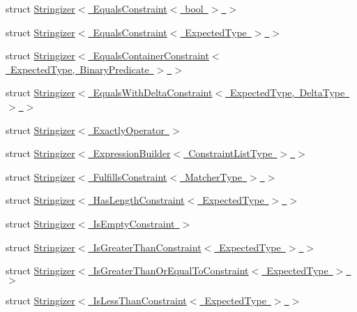 \begin{DoxyCompactItemize}
\item 
struct \mbox{\hyperlink{structsnowhouse_1_1Stringizer_3_01EqualsConstraint_3_01bool_01_4_01_4}{Stringizer$<$ Equals\+Constraint$<$ bool $>$ $>$}}
\item 
struct \mbox{\hyperlink{structsnowhouse_1_1Stringizer_3_01EqualsConstraint_3_01ExpectedType_01_4_01_4}{Stringizer$<$ Equals\+Constraint$<$ Expected\+Type $>$ $>$}}
\item 
struct \mbox{\hyperlink{structsnowhouse_1_1Stringizer_3_01EqualsContainerConstraint_3_01ExpectedType_00_01BinaryPredicate_01_4_01_4}{Stringizer$<$ Equals\+Container\+Constraint$<$ Expected\+Type, Binary\+Predicate $>$ $>$}}
\item 
struct \mbox{\hyperlink{structsnowhouse_1_1Stringizer_3_01EqualsWithDeltaConstraint_3_01ExpectedType_00_01DeltaType_01_4_01_4}{Stringizer$<$ Equals\+With\+Delta\+Constraint$<$ Expected\+Type, Delta\+Type $>$ $>$}}
\item 
struct \mbox{\hyperlink{structsnowhouse_1_1Stringizer_3_01ExactlyOperator_01_4}{Stringizer$<$ Exactly\+Operator $>$}}
\item 
struct \mbox{\hyperlink{structsnowhouse_1_1Stringizer_3_01ExpressionBuilder_3_01ConstraintListType_01_4_01_4}{Stringizer$<$ Expression\+Builder$<$ Constraint\+List\+Type $>$ $>$}}
\item 
struct \mbox{\hyperlink{structsnowhouse_1_1Stringizer_3_01FulfillsConstraint_3_01MatcherType_01_4_01_4}{Stringizer$<$ Fulfills\+Constraint$<$ Matcher\+Type $>$ $>$}}
\item 
struct \mbox{\hyperlink{structsnowhouse_1_1Stringizer_3_01HasLengthConstraint_3_01ExpectedType_01_4_01_4}{Stringizer$<$ Has\+Length\+Constraint$<$ Expected\+Type $>$ $>$}}
\item 
struct \mbox{\hyperlink{structsnowhouse_1_1Stringizer_3_01IsEmptyConstraint_01_4}{Stringizer$<$ Is\+Empty\+Constraint $>$}}
\item 
struct \mbox{\hyperlink{structsnowhouse_1_1Stringizer_3_01IsGreaterThanConstraint_3_01ExpectedType_01_4_01_4}{Stringizer$<$ Is\+Greater\+Than\+Constraint$<$ Expected\+Type $>$ $>$}}
\item 
struct \mbox{\hyperlink{structsnowhouse_1_1Stringizer_3_01IsGreaterThanOrEqualToConstraint_3_01ExpectedType_01_4_01_4}{Stringizer$<$ Is\+Greater\+Than\+Or\+Equal\+To\+Constraint$<$ Expected\+Type $>$ $>$}}
\item 
struct \mbox{\hyperlink{structsnowhouse_1_1Stringizer_3_01IsLessThanConstraint_3_01ExpectedType_01_4_01_4}{Stringizer$<$ Is\+Less\+Than\+Constraint$<$ Expected\+Type $>$ $>$}}

\end{DoxyCompactItemize}
